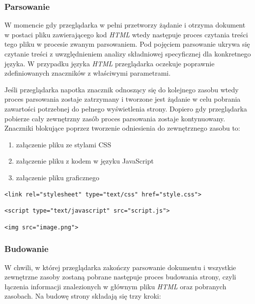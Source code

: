 \documentclass[polish, twoside, 12pt]{mwart}
\begin{document}
\subsubsection{Parsowanie}

W momencie gdy przeglądarka w pełni przetworzy żądanie i otrzyma dokument w postaci pliku zawierającego kod \emph{HTML} wtedy następuje proces czytania treści tego pliku w procesie zwanym parsowaniem. Pod pojęciem parsowanie ukrywa się czytanie treści z uwzględnieniem analizy składniowej specyficznej dla konkretnego języka. W przypadku języka \emph{HTML} przeglądarka oczekuje poprawnie zdefiniowanych znaczników z właściwymi parametrami. 

Jeśli przeglądarka napotka znacznik odnoszący się do kolejnego zasobu wtedy proces parsowania zostaje zatrzymany i tworzone jest żądanie  w celu pobrania zawartości potrzebnej do pełnego wyświetlenia strony. Dopiero gdy przeglądarka pobierze cały zewnętrzny zasób proces parsowania zostaje kontynuowany. Znaczniki blokujące poprzez tworzenie odniesienia do zewnętrznego zasobu to:

\begin{enumerate}
  \item załączenie pliku ze stylami CSS
  \item załączenie pliku z kodem w języku JavaScript
  \item załączenie pliku graficznego
\end{enumerate}

\begin{lstlisting}[caption=Przykładowe załączenie pliku ze stylami \emph{css}]
<link rel="stylesheet" type="text/css" href="style.css">
\end{lstlisting}

\begin{lstlisting}[caption=Przykładowe załączenie pliku z kodem w języku \emph{JavaScript}]
<script type="text/javascript" src="script.js">
\end{lstlisting}

\begin{lstlisting}[caption=Przykładowe załączenie pliku graficznego]
<img src="image.png">
\end{lstlisting}

\subsubsection{Budowanie}

W chwili, w której przeglądarka zakończy parsowanie dokumentu i wszystkie zewnętrzne zasoby zostaną pobrane następuje proces budowania strony, czyli łączenia informacji znalezionych w głównym pliku \emph{HTML} oraz pobranych zasobach. Na budowę strony składają się trzy kroki:
\end{document}
